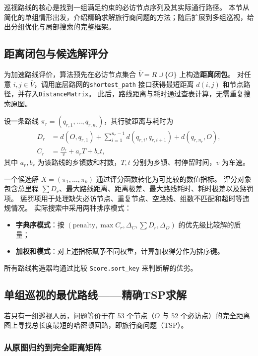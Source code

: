 \documentclass[a4paper, 12pt]{article}
\begin{document}
巡视路线的核心是找到一组满足约束的必访节点序列及其实际通行路径。
本节从简化的单组情形出发，介绍精确求解旅行商问题的方法；随后扩展到多组巡视，给出分组优化与局部搜索的完整框架。

\subsection{距离闭包与候选解评分}

为加速路线评价，算法预先在必访节点集合 $\bar V = R \cup \{O\}$ 上构造{\bfseries 距离闭包}。
对任意 $i,j\in\bar V$，调用底层路网的\texttt{shortest\_path} 接口获得最短距离 $d(i,j)$ 和节点路径，并存入\texttt{DistanceMatrix}。
此后，路线距离与耗时通过查表计算，无需重复搜索原图。

设一条路线 $\pi_r = (q_{r,1},\ldots,q_{r,n_r})$，其行驶距离与耗时为
\begin{align}
    D_r &= d(O,q_{r,1}) + \sum_{i=1}^{n_r-1} d(q_{r,i},q_{r,i+1}) + d(q_{r,n_r},O), \label{eq:route-distance-impl} \\
    C_r &= \frac{D_r}{v} + a_r T + b_r t, \label{eq:route-time-impl}
\end{align}
其中 $a_r,b_r$ 为该路线的乡镇数和村数，$T,t$ 分别为乡镇、村停留时间，$v$ 为车速。

一个候选解 $X=(\pi_1,\dots,\pi_k)$ 通过评分函数转化为可比较的数值指标。
评分对象包含总里程 $\sum D_r$、最大路线距离、距离极差、最大路线耗时、耗时极差以及惩罚项。
惩罚项用于处理缺失必访节点、重复节点、空路线、组数不匹配和超时等违规情况。
实际搜索中采用两种排序模式：
\begin{itemize}
    \item \textbf{字典序模式}：按 $(\text{penalty},\max C_r,\Delta_C,\sum D_r,\Delta_D)$ 的优先级比较解的质量；
    \item \textbf{加权和模式}：对上述指标赋予不同权重，计算加权得分作为排序键。
\end{itemize}
所有路线构造器均通过比较 \texttt{Score.sort\_key} 来判断解的优劣。

\subsection{单组巡视的最优路线——精确TSP求解}

若只有一组巡视人员，问题等价于在 53 个节点（$O$ 与 52 个必访点）的完全距离图上寻找总长度最短的哈密顿回路，即旅行商问题（TSP）。

\subsubsection{从原图归约到完全距离矩阵}
\end{document}
